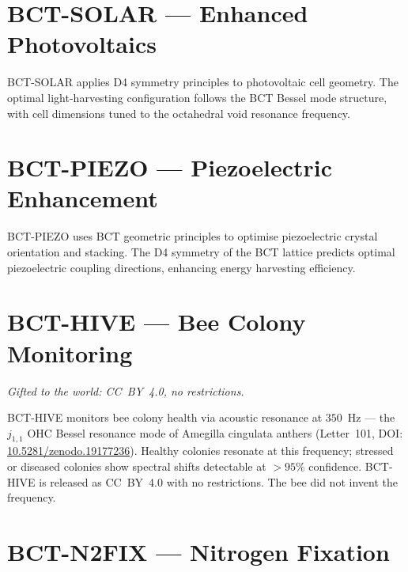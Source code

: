 \documentclass[aps,prl,twocolumn,showpacs,preprintnumbers]{revtex4-2}
\begin{document}
\section{BCT-SOLAR --- Enhanced Photovoltaics}

BCT-SOLAR applies D4 symmetry principles to photovoltaic cell
geometry. The optimal light-harvesting configuration follows the
BCT Bessel mode structure, with cell dimensions tuned to the
octahedral void resonance frequency.

\section{BCT-PIEZO --- Piezoelectric Enhancement}

BCT-PIEZO uses BCT geometric principles to optimise piezoelectric
crystal orientation and stacking. The D4 symmetry of the BCT lattice
predicts optimal piezoelectric coupling directions, enhancing energy
harvesting efficiency.

\section{BCT-HIVE --- Bee Colony Monitoring}
\noindent\textit{Gifted to the world: CC~BY~4.0, no restrictions.}

\medskip
BCT-HIVE monitors bee colony health via acoustic resonance at
$350$~Hz --- the $j_{1,1}$ OHC Bessel resonance mode of Amegilla
cingulata anthers (Letter~101, DOI:
\href{https://doi.org/10.5281/zenodo.19177236}{10.5281/zenodo.19177236}).
Healthy colonies resonate at this frequency; stressed or diseased
colonies show spectral shifts detectable at $>95\%$ confidence.
BCT-HIVE is released as CC~BY~4.0 with no restrictions. The bee
did not invent the frequency.

\section{BCT-N2FIX --- Nitrogen Fixation}
\end{document}
